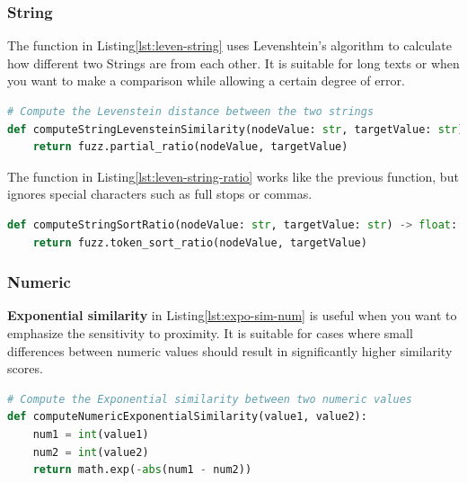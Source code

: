     \subsubsection{String}
    The function in Listing\ref{lst:leven-string} uses Levenshtein's algorithm to calculate how different two Strings are from each other. It is suitable for long texts or when you want to make a comparison while allowing a certain degree of error.\\
    
\begin{lstlisting}[language=Python, caption=Levenstein distance between two strings, label={lst:leven-string}]
# Compute the Levenstein distance between the two strings
def computeStringLevensteinSimilarity(nodeValue: str, targetValue: str) -> float:
    return fuzz.partial_ratio(nodeValue, targetValue)
\end{lstlisting}
    
    
    The function in Listing\ref{lst:leven-string-ratio} works like the previous function, but ignores special characters such as full stops or commas.\\
    
\begin{lstlisting}[language=Python, caption=Levenstein distance between two strings without considering special characters, label={lst:leven-string-ratio}]
def computeStringSortRatio(nodeValue: str, targetValue: str) -> float:
    return fuzz.token_sort_ratio(nodeValue, targetValue)
\end{lstlisting}





    \subsubsection{Numeric}
    
    \textbf{Exponential similarity} in Listing\ref{lst:expo-sim-num} is useful when you want to emphasize the sensitivity to proximity. It is suitable for cases where small differences between numeric values should result in significantly higher similarity scores.\\
    
\begin{lstlisting}[language=Python, caption=Function to compute the similarity value between two attributes, label={lst:expo-sim-num}]
# Compute the Exponential similarity between two numeric values
def computeNumericExponentialSimilarity(value1, value2):
    num1 = int(value1)
    num2 = int(value2)
    return math.exp(-abs(num1 - num2))
\end{lstlisting}
    
